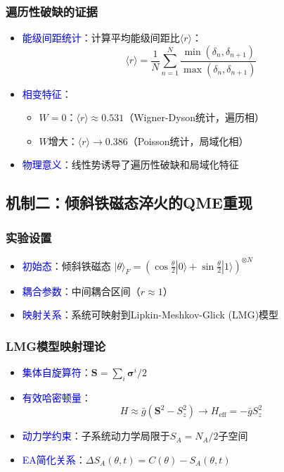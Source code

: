 \documentclass[11pt,a4paper]{article}
\begin{document}
\subsubsection{遍历性破缺的证据}
\begin{itemize}
    \item \textcolor{blue}{能级间距统计}：计算平均能级间距比$\langle r \rangle$：
    \[
    \langle r \rangle = \frac{1}{N}\sum_{n=1}^{N} \frac{\min(\delta_n, \delta_{n+1})}{\max(\delta_n, \delta_{n+1})}
    \]
    \item \textcolor{blue}{相变特征}：
    \begin{itemize}
        \item $W = 0$：$\langle r \rangle \approx 0.531$（Wigner-Dyson统计，遍历相）
        \item $W$增大：$\langle r \rangle \rightarrow 0.386$（Poisson统计，局域化相）
    \end{itemize}
    \item \textcolor{blue}{物理意义}：线性势诱导了遍历性破缺和局域化特征
\end{itemize}

\subsection{机制二：倾斜铁磁态淬火的QME重现}

\subsubsection{实验设置}
\begin{itemize}
    \item \textcolor{blue}{初始态}：倾斜铁磁态 $|\theta\rangle_F = (\cos\frac{\theta}{2}|0\rangle + \sin\frac{\theta}{2}|1\rangle)^{\otimes N}$
    \item \textcolor{blue}{耦合参数}：中间耦合区间（$r \approx 1$）
    \item \textcolor{blue}{映射关系}：系统可映射到Lipkin-Meshkov-Glick (LMG)模型
\end{itemize}

\subsubsection{LMG模型映射理论}
\begin{itemize}
    \item \textcolor{blue}{集体自旋算符}：$\bm{S} = \sum_i \bm{\sigma}^i/2$
    \item \textcolor{blue}{有效哈密顿量}：
    \[
    H \approx \bar{g}(\bm{S}^2 - S_z^2) \rightarrow H_{\text{eff}} = -\bar{g}S_z^2
    \]
    \item \textcolor{blue}{动力学约束}：子系统动力学局限于$S_A = N_A/2$子空间
    \item \textcolor{blue}{EA简化关系}：$\Delta S_A(\theta,t) = C(\theta) - S_A(\theta,t)$
\end{itemize}
\end{document}
